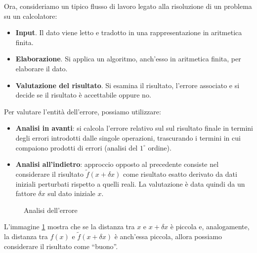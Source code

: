 \documentclass{article}
\begin{document}
Ora, consideriamo un tipico flusso di lavoro legato alla risoluzione di un
problema su un calcolatore:
\begin{itemize}
    \item \textbf{Input}. Il dato viene letto e tradotto in
        una rappresentazione in aritmetica finita.
    \item \textbf{Elaborazione}. Si applica un algoritmo, anch'esso in aritmetica
    finita, per elaborare il dato.
    \item \textbf{Valutazione del risultato}. Si esamina il risultato,
        l'errore associato e si decide se il risultato è
        accettabile oppure no.
\end{itemize}
Per valutare l'entità dell'errore, possiamo utilizzare:
\begin{itemize}
    \item\textbf{Analisi in avanti}: si calcola l'errore relativo sul
        sul risultato finale in termini degli errori introdotti dalle singole
        operazioni, trascurando i termini in cui compaiono prodotti di errori
        (analisi del $1^{\circ}$ ordine).
    \item\textbf{Analisi all'indietro}: approccio opposto al precedente
        consiste nel considerare il risultato $\tilde{f}(x+\delta x)$ come risultato 
        esatto derivato da dati iniziali perturbati rispetto a quelli reali.
        La valutazione è data quindi da un fattore
        $\delta x$ sul dato iniziale $x$.
\end{itemize}
\begin{figure}
    \centering
\caption{Analisi dell'errore}
\label{fig:analisi_errore}
\end{figure}
L'immagine \ref{fig:analisi_errore} mostra che se la distanza tra $x$ e
$x+\delta x$ è piccola e, analogamente, la distanza tra $f(x)$ e
$\tilde{f}(x+\delta x)$ è anch'essa piccola, allora possiamo considerare il
risultato come ``buono''.
\end{document}

